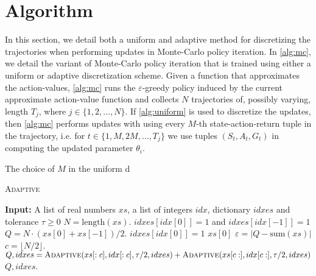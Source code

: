 \section{Algorithm}
In this section, we detail both a uniform and adaptive method for discretizing the trajectories when performing updates in Monte-Carlo policy iteration. In \cref{alg:mc}, we detail the variant of Monte-Carlo policy iteration that is trained using either a uniform or adaptive discretization scheme. Given a function that approximates the action-values, \cref{alg:mc} runs the $\varepsilon$-greedy policy induced by the current approximate action-value function and collects $N$ trajectories of, possibly varying, length $T_j$, where $j \in \{1,2,\dotsc,N\}$. If \cref{alg:uniform} is used to discretize the updates, then \cref{alg:mc} performs updates with using every $M$-th state-action-return tuple in the trajectory, i.e. for $t \in \{1,M,2M,\dotsc,T_j\}$ we use tuples $(S_t, A_t, G_t)$ in computing the updated parameter $\theta_i$. 

The choice of $M$ in the uniform d
    

\begin{algorithm}[t]
    \caption{\textsc{Adaptive}}\label{alg:adaptive-quadrature}
    \begin{algorithmic}
    \State \textbf{Input:} A list of real numbers $xs$, a list of integers $idx$, dictionary $idxes$ and tolerance $\tau \geq 0$
    \State $N = \text{length}(xs)$.
        \State $idxes[idx[0]] = 1$ and $idxes[idx[-1]] = 1$
        \State $Q = N \cdot (xs[0] + xs[-1]) / 2$.
    \Else
        \State $idxes[idx[0]] =1$
        \State \Return $xs[0]$
    \EndIf
    \State $\varepsilon = |Q - \text{sum}(xs)|$
    \If{$\varepsilon \geq \tau$}
        \State $c = \lfloor N / 2 \rfloor$.
        \State $Q, idxes = \textsc{Adaptive}(xs[:c], idx[:c], \tau /2, idxes) + \textsc{Adaptive}(xs[c:], idx[c:], \tau /2, idxes)$
    \EndIf
    \State \Return $Q, idxes$.
    \end{algorithmic}
    \end{algorithm}


